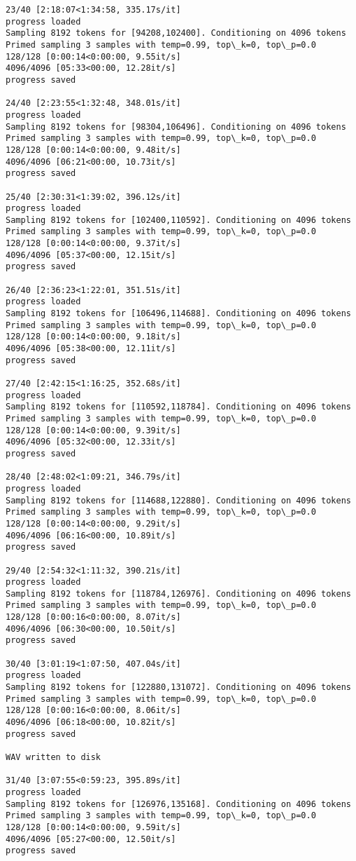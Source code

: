 \documentclass[11pt]{article}
\begin{document}
\begin{Verbatim}[commandchars=\\\{\}]
23/40 [2:18:07<1:34:58, 335.17s/it]
progress loaded
Sampling 8192 tokens for [94208,102400]. Conditioning on 4096 tokens
Primed sampling 3 samples with temp=0.99, top\_k=0, top\_p=0.0
128/128 [0:00:14<0:00:00, 9.55it/s]
4096/4096 [05:33<00:00, 12.28it/s]
progress saved

24/40 [2:23:55<1:32:48, 348.01s/it]
progress loaded
Sampling 8192 tokens for [98304,106496]. Conditioning on 4096 tokens
Primed sampling 3 samples with temp=0.99, top\_k=0, top\_p=0.0
128/128 [0:00:14<0:00:00, 9.48it/s]
4096/4096 [06:21<00:00, 10.73it/s]
progress saved

25/40 [2:30:31<1:39:02, 396.12s/it]
progress loaded
Sampling 8192 tokens for [102400,110592]. Conditioning on 4096 tokens
Primed sampling 3 samples with temp=0.99, top\_k=0, top\_p=0.0
128/128 [0:00:14<0:00:00, 9.37it/s]
4096/4096 [05:37<00:00, 12.15it/s]
progress saved

26/40 [2:36:23<1:22:01, 351.51s/it]
progress loaded
Sampling 8192 tokens for [106496,114688]. Conditioning on 4096 tokens
Primed sampling 3 samples with temp=0.99, top\_k=0, top\_p=0.0
128/128 [0:00:14<0:00:00, 9.18it/s]
4096/4096 [05:38<00:00, 12.11it/s]
progress saved

27/40 [2:42:15<1:16:25, 352.68s/it]
progress loaded
Sampling 8192 tokens for [110592,118784]. Conditioning on 4096 tokens
Primed sampling 3 samples with temp=0.99, top\_k=0, top\_p=0.0
128/128 [0:00:14<0:00:00, 9.39it/s]
4096/4096 [05:32<00:00, 12.33it/s]
progress saved

28/40 [2:48:02<1:09:21, 346.79s/it]
progress loaded
Sampling 8192 tokens for [114688,122880]. Conditioning on 4096 tokens
Primed sampling 3 samples with temp=0.99, top\_k=0, top\_p=0.0
128/128 [0:00:14<0:00:00, 9.29it/s]
4096/4096 [06:16<00:00, 10.89it/s]
progress saved

29/40 [2:54:32<1:11:32, 390.21s/it]
progress loaded
Sampling 8192 tokens for [118784,126976]. Conditioning on 4096 tokens
Primed sampling 3 samples with temp=0.99, top\_k=0, top\_p=0.0
128/128 [0:00:16<0:00:00, 8.07it/s]
4096/4096 [06:30<00:00, 10.50it/s]
progress saved

30/40 [3:01:19<1:07:50, 407.04s/it]
progress loaded
Sampling 8192 tokens for [122880,131072]. Conditioning on 4096 tokens
Primed sampling 3 samples with temp=0.99, top\_k=0, top\_p=0.0
128/128 [0:00:16<0:00:00, 8.06it/s]
4096/4096 [06:18<00:00, 10.82it/s]
progress saved

WAV written to disk

31/40 [3:07:55<0:59:23, 395.89s/it]
progress loaded
Sampling 8192 tokens for [126976,135168]. Conditioning on 4096 tokens
Primed sampling 3 samples with temp=0.99, top\_k=0, top\_p=0.0
128/128 [0:00:14<0:00:00, 9.59it/s]
4096/4096 [05:27<00:00, 12.50it/s]
progress saved


\end{Verbatim}
\end{document}
